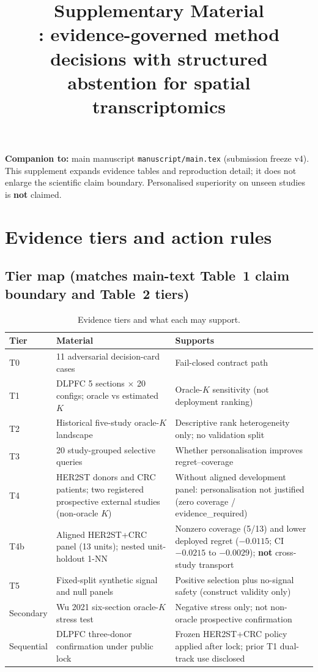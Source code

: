 \documentclass[11pt]{article}
\title{Supplementary Material\\
\large \software: evidence-governed method decisions with structured
abstention for spatial transcriptomics}
\author{\required{author metadata must match the main manuscript}}
\date{}
\begin{document}
\maketitle

\noindent\textbf{Companion to:} main manuscript \texttt{manuscript/main.tex}
(submission freeze v4). This supplement expands evidence tables and
reproduction detail; it does not enlarge the scientific claim boundary.
Personalised superiority on unseen studies is \textbf{not} claimed.

\section{Evidence tiers and action rules}

\subsection{Tier map (matches main-text Table~1 claim boundary and Table~2 tiers)}

\begin{table}[ht]
\centering
\caption{Evidence tiers and what each may support.
\label{tab:si-tiers}}
\begin{tabular}{@{}llp{}@{}}
\toprule
Tier & Material & Supports \\
\midrule
T0 & 11 adversarial decision-card cases & Fail-closed contract path \\
T1 & DLPFC 5 sections $\times$ 20 configs; oracle vs estimated \(K\) &
Oracle-\(K\) sensitivity (not deployment ranking) \\
T2 & Historical five-study oracle-\(K\) landscape &
Descriptive rank heterogeneity only; no validation split \\
T3 & 20 study-grouped selective queries &
Whether personalisation improves regret--coverage \\
T4 & HER2ST donors and CRC patients; two registered prospective external
studies (non-oracle \(K\)) &
Without aligned development panel: personalisation not justified
(zero coverage / evidence\_required) \\
T4b & Aligned HER2ST+CRC panel (13 units); nested unit-holdout 1-NN &
Nonzero coverage (5/13) and lower deployed regret ($-0.0115$;
CI $-0.0215$ to $-0.0029$); \textbf{not} cross-study transport \\
T5 & Fixed-split synthetic signal and null panels &
Positive selection plus no-signal safety (construct validity only) \\
Secondary & Wu 2021 six-section oracle-\(K\) stress test &
Negative stress only; not non-oracle prospective confirmation \\
Sequential & DLPFC three-donor confirmation under public lock &
Frozen HER2ST+CRC policy applied after lock; prior T1 dual-track use disclosed \\
\bottomrule
\end{tabular}
\end{table}
\end{document}
